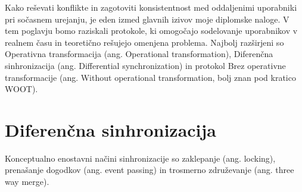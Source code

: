 \documentclass[a4paper, 12pt, twoside]{book}
\begin{document}
Kako reševati konflikte in zagotoviti konsistentnost med oddaljenimi uporabniki pri sočasnem urejanju, je eden izmed glavnih izivov moje diplomske naloge. V tem poglavju bomo raziskali protokole, ki omogočajo sodelovanje uporabnikov v realnem času in teoretično rešujejo omenjena problema. Najbolj razširjeni so Operativna transformacija (ang. Operational transformation), Diferenčna sinhronizacija (ang. Differential synchronization) in protokol Brez operativne transformacije (ang. Without operational transformation, bolj znan pod kratico WOOT).

\section{Diferenčna sinhronizacija}
\label{sec:ds}

Konceptualno enostavni načini sinhronizacije so zaklepanje (ang. locking), prenašanje dogodkov (ang. event passing) in trosmerno združevanje (ang. three way merge).
\end{document}
